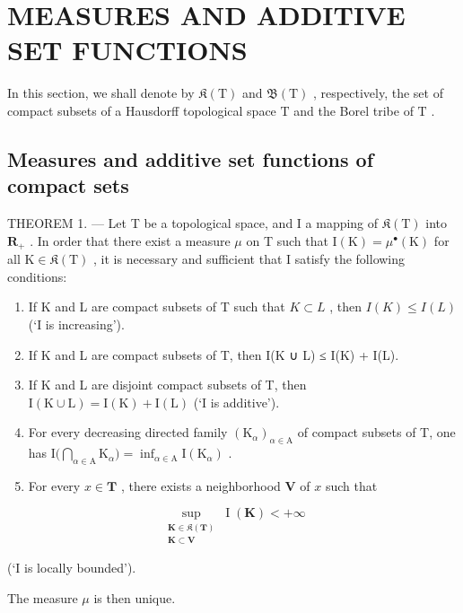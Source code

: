 \section{MEASURES AND ADDITIVE SET FUNCTIONS}

In this section, we shall denote by \(\mathfrak{K}(\mathrm{T})\) and \(\mathfrak{B}(\mathrm{T})\) , respectively, the set of compact subsets of a Hausdorff topological space \(\mathrm{T}\) and the Borel tribe of \(\mathrm{T}\) .

\subsection{Measures and additive set functions of compact sets}

THEOREM 1. --- Let T be a topological space, and I a mapping of \(\mathfrak{K}(\mathrm{T})\) into \(\mathbf{R}_{+}\) . In order that there exist a measure \(\mu\) on T such that \(\mathrm{I}(\mathrm{K}) = \mu^{\bullet}(\mathrm{K})\) for all \(\mathrm{K} \in \mathfrak{K}(\mathrm{T})\) , it is necessary and sufficient that I satisfy the following conditions:

\begin{enumerate}
\def\labelenumi{\arabic{enumi})}
\item
  If K and L are compact subsets of T such that \(K \subset L\) , then \(I(K) \leqslant I(L)\) (`I is increasing').
\item
  If K and L are compact subsets of T, then I(K ∪ L) ≤ I(K) + I(L).
\item
  If K and L are disjoint compact subsets of T, then \(\mathrm{I}(\mathrm{K}\cup\mathrm{L})=\mathrm{I}(\mathrm{K})+\mathrm{I}(\mathrm{L})\) (`I is additive').
\item
  For every decreasing directed family \((\mathrm{K}_{\alpha})_{\alpha \in \mathrm{A}}\) of compact subsets of T, one has \(\mathrm{I}\big(\bigcap_{\alpha \in \mathrm{A}}\mathrm{K}_{\alpha}\big) = \inf_{\alpha \in \mathrm{A}}\mathrm{I}(\mathrm{K}_{\alpha})\) .
\item
  For every \(x \in \mathbf{T}\) , there exists a neighborhood \(\mathbf{V}\) of \(x\) such that
\end{enumerate}

\[
\sup_{\substack{\mathbf{K}\in \mathfrak{K}(\mathbf{T})\\ \mathbf{K}\subset \mathbf{V}}}\operatorname{I}(\mathbf{K}) <   + \infty
\]

(`I is locally bounded').

The measure \(\mu\) is then unique.

